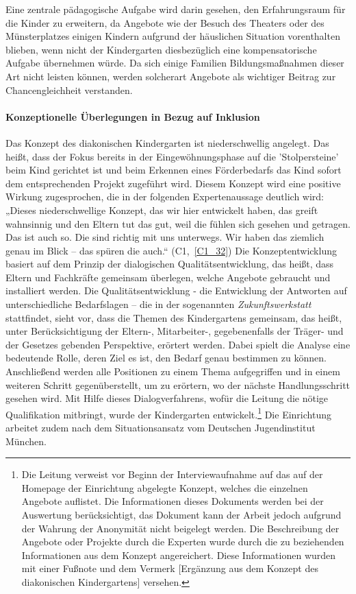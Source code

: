 Eine zentrale pädagogische Aufgabe wird darin gesehen, den Erfahrungsraum für die Kinder zu erweitern, da Angebote wie der Besuch des Theaters oder des Münsterplatzes einigen Kindern aufgrund der häuslichen Situation vorenthalten blieben, wenn nicht der Kindergarten diesbezüglich eine kompensatorische Aufgabe übernehmen würde. 
Da sich einige Familien Bildungsmaßnahmen dieser Art nicht leisten können, werden solcherart Angebote als wichtiger Beitrag zur Chancengleichheit verstanden.

\paragraph{Konzeptionelle Überlegungen in Bezug auf Inklusion}
Das Konzept des diakonischen Kindergarten ist niederschwellig angelegt. Das heißt, dass der Fokus bereits in der Eingewöhnungsphase auf die 'Stolpersteine' beim Kind gerichtet ist und beim Erkennen eines  Förderbedarfs das Kind sofort dem entsprechenden Projekt zugeführt wird. Diesem Konzept wird eine positive Wirkung zugesprochen, die in der folgenden Expertenaussage deutlich wird: „Dieses niederschwellige Konzept, das wir hier entwickelt haben, das greift wahnsinnig und den Eltern tut das gut, weil die fühlen sich gesehen und getragen. Das ist auch so. Die sind richtig mit uns unterwegs. Wir haben das ziemlich genau im Blick -- das spüren die auch.“ (C1,~\ref{C1_32}) 
Die Konzeptentwicklung basiert auf dem Prinzip der dialogischen Qualitätsentwicklung, das heißt, dass Eltern und Fachkräfte gemeinsam überlegen, welche Angebote gebraucht und installiert werden. Die Qualitätsentwicklung - die Entwicklung der Antworten auf unterschiedliche Bedarfslagen -- die in der sogenannten \emph{Zukunftswerkstatt} stattfindet, sieht vor, dass die Themen des Kindergartens gemeinsam, das heißt, unter Berücksichtigung der Eltern-,  Mitarbeiter-, gegebenenfalls der Träger- und der Gesetzes gebenden Perspektive, erörtert werden. Dabei spielt die Analyse eine bedeutende Rolle, deren Ziel es ist, den Bedarf genau bestimmen zu können.  Anschließend werden alle Positionen zu einem Thema aufgegriffen und in einem weiteren Schritt gegenüberstellt, um zu erörtern, wo der nächste Handlungsschritt gesehen wird. Mit Hilfe dieses Dialogverfahrens, wofür die Leitung die nötige Qualifikation mitbringt, wurde der Kindergarten entwickelt.\footnote{Die Leitung verweist vor Beginn der Interviewaufnahme auf das auf der Homepage der Einrichtung abgelegte Konzept, welches die einzelnen Angebote auflistet. Die Informationen dieses Dokuments werden bei der Auswertung berücksichtigt, das Dokument kann der Arbeit jedoch aufgrund der Wahrung der Anonymität nicht beigelegt werden. Die Beschreibung der Angebote oder Projekte durch die Experten wurde durch die zu beziehenden Informationen aus dem Konzept angereichert. Diese Informationen wurden mit einer Fußnote und dem Vermerk [Ergänzung aus dem Konzept des diakonischen Kindergartens] versehen.} Die Einrichtung arbeitet zudem nach dem Situationsansatz vom Deutschen Jugendinstitut München. 

